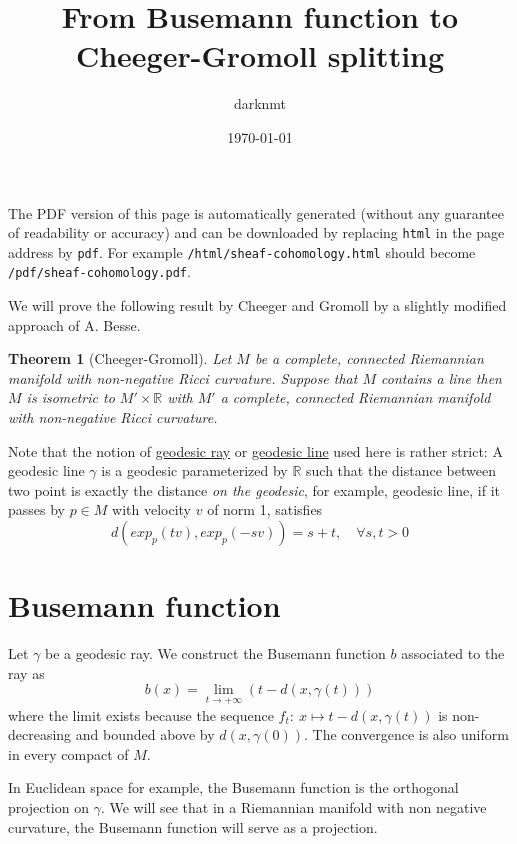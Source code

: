 \documentclass[11pt]{article}
\author{darknmt}
\date{\today}
\title{From Busemann function to Cheeger-Gromoll splitting}
\newtheorem{theorem}{Theorem}
\begin{document}
\maketitle
\tableofcontents

\begin{info}
The PDF version of this page is automatically generated (without any guarantee of
readability or accuracy) and can be downloaded by replacing \texttt{html} in the page address by
\texttt{pdf}. 
For example \texttt{/html/sheaf-cohomology.html} should become \texttt{/pdf/sheaf-cohomology.pdf}.
\end{info}


We will prove the following result by Cheeger and Gromoll by a slightly modified approach of
A. Besse.


\begin{theorem}[Cheeger-Gromoll]
\label{org547c731}
\label{thm:cheeger-gromoll}
Let \(M\) be a complete, connected Riemannian manifold with non-negative Ricci curvature. Suppose
that \(M\) contains a line then \(M\) is isometric to \(M'\times \mathbb{R}\) with \(M'\) a complete,
connected Riemannian manifold with non-negative Ricci curvature.
\end{theorem}

Note that the notion of \uline{geodesic ray} or \uline{geodesic line} used here is rather strict: A geodesic
line \(\gamma\) is a geodesic parameterized by \(\mathbb{R}\) such that the distance between two point is
exactly the distance \emph{on the geodesic}, for example, geodesic line, if it passes by \(p\in M\) with
velocity \(v\) of norm 1, satisfies
\[
d(exp_p(tv), exp_p(-sv)) = s+t,\quad \forall s,t>0
\]


\section{Busemann function}
\label{sec:org3365e84}

Let \(\gamma\) be a geodesic ray. We construct the Busemann function \(b\) associated to the ray as
\[
b(x) = \lim_{t\to+\infty}\left( t - d(x,\gamma(t))\right)
\]
where the limit exists because the sequence \(f_t:\ x\mapsto t - d(x,\gamma(t))\) is non-decreasing and bounded above by
\(d(x,\gamma(0))\). The convergence is also uniform in every compact of \(M\). 


In Euclidean space for example, the Busemann function is the orthogonal projection on \(\gamma\). We
will see that in a Riemannian manifold with non negative curvature, the Busemann function will serve
as a projection.
\end{document}
